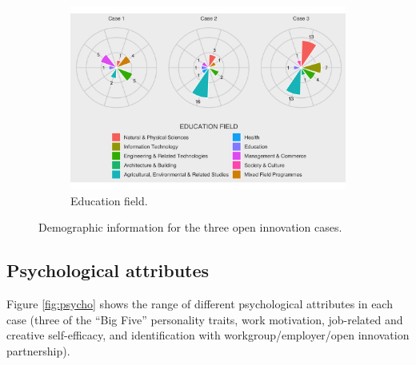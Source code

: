 \begin{figure}
\begin{subfigure}[b]{0.7\textwidth}
\includegraphics[width=1\linewidth]{Images/ed_field.png}
\caption{Education field.}
\end{subfigure}

\caption[Demographic information for each case]{Demographic information for the three open innovation cases.}
\label{fig:demographics}
\end{figure}


\subsection{Psychological attributes}

Figure \ref{fig:psycho} shows the range of different psychological attributes in each case (three of the \enquote{Big Five} personality traits, work motivation, job-related and creative self-efficacy, and identification with workgroup/employer/open innovation partnership). 


